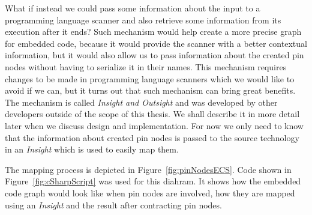 \par
What if instead we could pass some information about the input to a programming language scanner and also retrieve some information from its execution after it ends? Such mechanism would help create a more precise graph for embedded code, because it would provide the scanner with a better contextual information, but it would also allow us to pass information about the created pin nodes without having to serialize it in their names. This mechanism requires changes to be made in programming language scanners which we would like to avoid if we can, but it turns out that such mechanism can bring great benefits. The mechanism is called \textit{Insight and Outsight} and was developed by other developers outside of the scope of this thesis. We shall describe it in more detail later when we discuss design and implementation. For now we only need to know that the information about created pin nodes is passed to the source technology in an \textit{Insight} which is used to easily map them.
\par
The mapping process is depicted in Figure~\ref{fig:pinNodesECS}. Code shown in Figure~\ref{fig:cSharpScript} was used for this diahram. It shows how the embedded code graph would look like when pin nodes are involved, how they are mapped using an \textit{Insight} and the result after contracting pin nodes.

